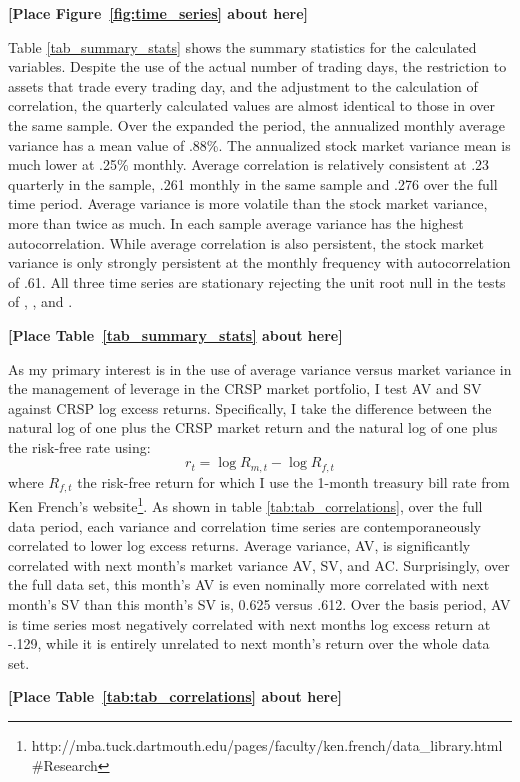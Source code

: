 \bigskip
\centerline{\bf [Place Figure~\ref{fig:time_series} about here]}
\bigskip
Table \ref{tab_summary_stats} shows the summary statistics for the calculated variables. Despite the use of the actual number of trading days, the restriction to assets that trade every trading day, and the adjustment to the calculation of correlation, the quarterly calculated values are almost identical to those in \citet{pollet_average_2010} over the same sample. Over the expanded the period, the annualized monthly average variance has a mean value of .88\%. The annualized stock market variance mean is much lower at .25\% monthly. Average correlation is relatively consistent at .23 quarterly in the \cite{pollet_average_2010} sample, .261 monthly in the same sample and .276 over the full time period. Average variance is more volatile than the stock market variance, more than twice as much. In each sample average variance has the highest autocorrelation. While average correlation is also persistent, the stock market variance is only strongly persistent at the monthly frequency with autocorrelation of .61. All three time series are stationary rejecting the unit root null in the tests of \citet{dickey_distribution_1979}, \citet{Ng2001}, and \citet{ers1996}.
\bigskip
\centerline{\bf [Place Table~\ref{tab_summary_stats} about here]}
\bigskip
As my primary interest is in the use of average variance versus market variance in the management of leverage in the CRSP market portfolio, I test AV and SV against CRSP log excess returns.
Specifically, I take the difference between the natural log of one plus the CRSP market return and the natural log of one plus the risk-free rate using:
\begin{equation}
	r_{t} = \log R_{m,t} - \log R_{f,t} 
\end{equation}
where $R_{f,t}$ the risk-free return for which I use the 1-month treasury bill rate from Ken French's website\footnote{http://mba.tuck.dartmouth.edu/pages/faculty/ken.french/data\_library.html\#Research}. As shown in table \ref{tab:tab_correlations}, over the full data period, each variance and correlation time series are contemporaneously correlated to lower log excess returns. Average variance, AV, is significantly correlated with next month's market variance AV, SV, and AC. Surprisingly, over the full data set, this month's AV is even nominally more correlated with next month's SV than this month's SV is, 0.625 versus .612. Over the basis period, AV is time series most negatively correlated with next months log excess return at -.129, while it is entirely unrelated to next month's return over the whole data set.
\bigskip
\centerline{\bf [Place Table~\ref{tab:tab_correlations} about here]}
\bigskip

